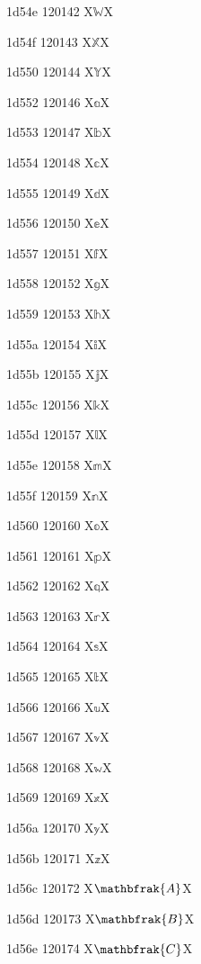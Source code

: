 \documentclass[11pt]{article}
\begin{document}
1d54e 120142 X{\ensuremath{\mathbb{W}}}X

1d54f 120143 X{\ensuremath{\mathbb{X}}}X

1d550 120144 X{\ensuremath{\mathbb{Y}}}X

1d552 120146 X{\ensuremath{\mathbb{a}}}X

1d553 120147 X{\ensuremath{\mathbb{b}}}X

1d554 120148 X{\ensuremath{\mathbb{c}}}X

1d555 120149 X{\ensuremath{\mathbb{d}}}X

1d556 120150 X{\ensuremath{\mathbb{e}}}X

1d557 120151 X{\ensuremath{\mathbb{f}}}X

1d558 120152 X{\ensuremath{\mathbb{g}}}X

1d559 120153 X{\ensuremath{\mathbb{h}}}X

1d55a 120154 X{\ensuremath{\mathbb{i}}}X

1d55b 120155 X{\ensuremath{\mathbb{j}}}X

1d55c 120156 X{\ensuremath{\mathbb{k}}}X

1d55d 120157 X{\ensuremath{\mathbb{l}}}X

1d55e 120158 X{\ensuremath{\mathbb{m}}}X

1d55f 120159 X{\ensuremath{\mathbb{n}}}X

1d560 120160 X{\ensuremath{\mathbb{o}}}X

1d561 120161 X{\ensuremath{\mathbb{p}}}X

1d562 120162 X{\ensuremath{\mathbb{q}}}X

1d563 120163 X{\ensuremath{\mathbb{r}}}X

1d564 120164 X{\ensuremath{\mathbb{s}}}X

1d565 120165 X{\ensuremath{\mathbb{t}}}X

1d566 120166 X{\ensuremath{\mathbb{u}}}X

1d567 120167 X{\ensuremath{\mathbb{v}}}X

1d568 120168 X{\ensuremath{\mathbb{w}}}X

1d569 120169 X{\ensuremath{\mathbb{x}}}X

1d56a 120170 X{\ensuremath{\mathbb{y}}}X

1d56b 120171 X{\ensuremath{\mathbb{z}}}X

1d56c 120172 X{\ensuremath{\mathbfrak{A}}}X

1d56d 120173 X{\ensuremath{\mathbfrak{B}}}X

1d56e 120174 X{\ensuremath{\mathbfrak{C}}}X
\end{document}
